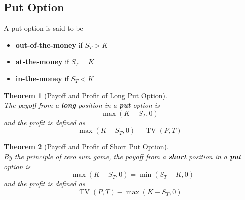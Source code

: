 \documentclass[12pt]{article}
\newtheorem{theorem}{Theorem}[section]
\theoremstyle{definition}
\DeclareMathOperator{\TV}{TV}
\begin{document}
\subsection{Put Option}
A put option is said to be
\begin{itemize}
  \item \textbf{out-of-the-money} if $S_T>K$
  \item \textbf{at-the-money} if $S_T=K$
  \item \textbf{in-the-money} if $S_T<K$
\end{itemize}
\begin{theorem}[Payoff and Profit of Long Put Option]
\hfill\\\normalfont The payoff from a \textbf{long} position in a \textbf{put} option is
\[
\max(K-S_T,0)
\]
and the profit is defined as
\[
\max(K-S_T,0)-\TV(P,T)
\]
\end{theorem}
\begin{theorem}[Payoff and Profit of Short Put Option]
\hfill\\\normalfont By the principle of zero sum game, the payoff from a \textbf{short} position in a \textbf{put} option is
\[
-\max(K-S_T,0)=\min(S_T-K,0)
\]
and the profit is defined as
\[
\TV(P,T)-\max(K-S_T,0)
\]
\end{theorem}
\end{document}
